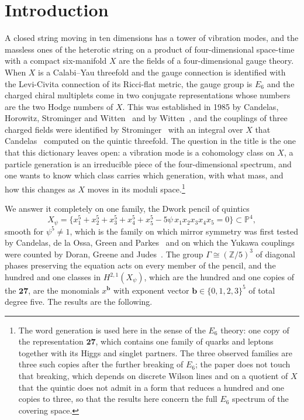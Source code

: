 \documentclass[11pt]{amsart}
\theoremstyle{definition}
\theoremstyle{remark}
\newcommand{\Z}{\mathbb{Z}}
\newcommand{\PP}{\mathbb{P}}
\newcommand{\bb}{\mathbf{b}}
\begin{document}
\setcounter{tocdepth}{1}
\tableofcontents

\section{Introduction}\label{sec:intro}

A closed string moving in ten dimensions has a tower of vibration modes, and
the massless ones of the heterotic string on a product of four-dimensional
space-time with a compact six-manifold $X$ are the fields of a
four-dimensional gauge theory. When $X$ is a Calabi--Yau threefold and the
gauge connection is identified with the Levi-Civita connection of its
Ricci-flat metric, the gauge group is $E_6$ and the charged chiral multiplets
come in two conjugate representations whose numbers are the two Hodge numbers
of $X$. This was established in 1985 by Candelas, Horowitz, Strominger and
Witten~\cite{CHSW85} and by Witten~\cite{Wit85}, and the couplings of three
charged fields were identified by Strominger~\cite{Str85} with an integral
over $X$ that Candelas~\cite{Can88} computed on the quintic threefold.
The question in the title is the one that this dictionary leaves open: a
vibration mode is a cohomology class on $X$, a particle generation is an
irreducible piece of the four-dimensional spectrum, and one wants to know
which class carries which generation, with what mass, and how this changes as
$X$ moves in its moduli space.\footnote{The word generation is used here in
the sense of the $E_6$ theory: one copy of the representation $\mathbf{27}$,
which contains one family of quarks and leptons together with its Higgs
and singlet partners. The three observed families are three such copies
after the further breaking of $E_6$; the paper does not touch that
breaking, which depends on discrete Wilson lines and on a quotient of $X$
that the quintic does not admit in a form that reduces a hundred and one
copies to three, so that the results here concern the full $E_6$ spectrum
of the covering space.}

We answer it completely on one family, the Dwork pencil of quintics
\begin{equation}\label{eq:dwork}
X_\psi=\{x_1^5+x_2^5+x_3^5+x_4^5+x_5^5-5\psi\,x_1x_2x_3x_4x_5=0\}\subset\PP^4,
\end{equation}
smooth for $\psi^5\ne1$, which is the family on which mirror symmetry was
first tested by Candelas, de la Ossa, Green and Parkes~\cite{CDGP91} and on
which the Yukawa couplings were counted by Doran, Greene and
Judes~\cite{DGJ08}. The group $\Gamma\cong(\Z/5)^3$ of diagonal phases
preserving the equation acts on every member of the pencil, and the
hundred and one classes in $H^{2,1}(X_\psi)$, which are the hundred and one
copies of the $\mathbf{27}$, are the monomials $x^{\bb}$ with exponent
vector $\bb\in\{0,1,2,3\}^5$ of total degree five. The results are the
following.
\end{document}

